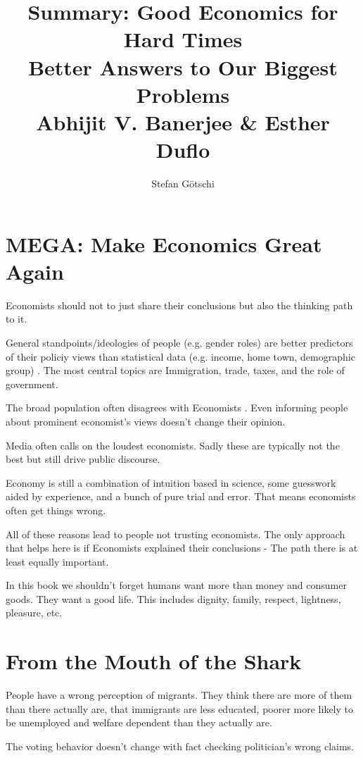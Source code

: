 \documentclass[a4paper, twocolumn]{article}
\title{Summary: Good Economics for Hard Times \\
	\large
	Better Answers to Our Biggest Problems\\
	Abhijit V. Banerjee \& Esther Duflo}
\author{Stefan Götschi}
\begin{document}
\maketitle

\raggedright

\section{MEGA: Make Economics Great Again}
\begin{mdframed}[style=mystyle,frametitle=Core Message]
Economists should not to just share their conclusions but also the thinking path to it.
\end{mdframed}

General standpoints/ideologies of people (e.g. gender roles) are better predictors of their policiy views than statistical data (e.g. income, home town, demographic group) \cite{hidden-tribes}. The most central topics are Immigration, trade, taxes, and the role of government.

The broad population often disagrees with Economists \cite{eco-vs-american}. Even informing people about prominent economist's views doesn't change their opinion.

Media often calls on the loudest economists. Sadly these are typically not the best but still drive public discourse.

Economy is still a combination of intuition based in science, some guesswork aided by experience, and a bunch of pure trial and error. That means economists often get things wrong.

All of these reasons lead to people not trusting economists. The only approach that helps here is if Economists explained their conclusions - The path there is at least equally important.

In this book we shouldn't forget humans want more than money and consumer goods. They want a good life. This includes dignity, family, respect, lightness, pleasure, etc.

\section{From the Mouth of the Shark}
People have a wrong perception of migrants. They think there are more of them than there actually are, that immigrants are less educated, poorer more likely to be unemployed and welfare dependent than they actually are.

The voting behavior doesn't change with fact checking politician's wrong claims.
\end{document}

